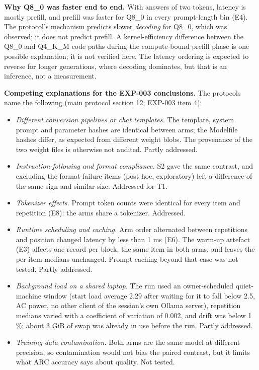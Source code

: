 \documentclass[
]{article}
\providecommand{\tightlist}{%
  \setlength{\itemsep}{0pt}\setlength{\parskip}{0pt}}
\begin{document}
\textbf{Why Q8\_0 was faster end to end.} With answers of two tokens,
latency is mostly prefill, and prefill was faster for Q8\_0 in every
prompt-length bin (E4). The protocol's mechanism predicts slower
\emph{decoding} for Q8\_0, which was observed; it does not predict
prefill. A kernel-efficiency difference between the Q8\_0 and Q4\_K\_M
code paths during the compute-bound prefill phase is one possible
explanation; it is not verified here. The latency ordering is expected
to reverse for longer generations, where decoding dominates, but that is
an inference, not a measurement.

\textbf{Competing explanations for the EXP-003 conclusions.} The
protocols name the following (main protocol section 12; EXP-003 item 4):

\begin{itemize}
\tightlist
\item
  \emph{Different conversion pipelines or chat templates.} The template,
  system prompt and parameter hashes are identical between arms; the
  Modelfile hashes differ, as expected from different weight blobs. The
  provenance of the two weight files is otherwise not audited. Partly
  addressed.
\item
  \emph{Instruction-following and format compliance.} S2 gave the same
  contrast, and excluding the format-failure items (post hoc,
  exploratory) left a difference of the same sign and similar size.
  Addressed for T1.
\item
  \emph{Tokenizer effects.} Prompt token counts were identical for every
  item and repetition (E8): the arms share a tokenizer. Addressed.
\item
  \emph{Runtime scheduling and caching.} Arm order alternated between
  repetitions and position changed latency by less than 1 ms (E6). The
  warm-up artefact (E3) affects one record per block, the same item in
  both arms, and leaves the per-item medians unchanged. Prompt caching
  beyond that case was not tested. Partly addressed.
\item
  \emph{Background load on a shared laptop.} The run used an
  owner-scheduled quiet-machine window (start load average 2.29 after
  waiting for it to fall below 2.5, AC power, no other client of the
  session's own Ollama server), repetition medians varied with a
  coefficient of variation of 0.002, and drift was below 1 \%; about 3
  GiB of swap was already in use before the run. Partly addressed.
\item
  \emph{Training-data contamination.} Both arms are the same model at
  different precision, so contamination would not bias the paired
  contrast, but it limits what ARC accuracy says about quality. Not
  tested.
\end{itemize}
\end{document}
